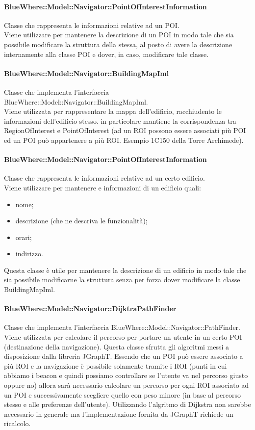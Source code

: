 \documentclass[../SpecificaTecnica.tex]{subfiles}
\begin{document}
				\paragraph{BlueWhere::Model::Navigator::PointOfInterestInformation}
					Classe che rappresenta le informazioni relative ad un POI. \\
					Viene utilizzare per mantenere la descrizione di un POI in modo tale che sia possibile modificare la struttura della stessa, al posto di avere la descrizione internamente alla classe POI e dover, in caso, modificare tale classe.
				\paragraph{BlueWhere::Model::Navigator::BuildingMapIml}
					Classe che implementa l'interfaccia BlueWhere::Model::Navigator::BuildingMapIml. \\
					Viene utilizzata per rappresentare la mappa dell'edificio, racchiudento le informazioni dell'edificio stesso. in particolare mantiene la corrispondenza tra RegionOfInterest e PointOfInterest (ad un ROI possono essere associati più POI ed un POI può appartenere a più ROI. Esempio 1C150 della Torre Archimede).
				\paragraph{BlueWhere::Model::Navigator::PointOfInterestInformation}
					Classe che rappresenta le informazioni relative ad un certo edificio. \\
					Viene utilizzare per mantenere e informazioni di un edificio quali:
					\begin{itemize}
						\item nome;
						\item descrizione (che ne descriva le funzionalità);
						\item orari;
						\item indirizzo.
					\end{itemize}
					Questa classe è utile per mantenere la descrizione di un edificio in modo tale che sia possibile modificarne la struttura senza per forza dover modificare la classe BuildingMapIml. 
				\paragraph{BlueWhere::Model::Navigator::DijktraPathFinder}
					Classe che implementa l'interfaccia BlueWhere::Model::Navigator::PathFinder. \\
					Viene utilizzata per calcolare il percorso per portare un utente in un certo POI (destinazione della navigazione). Questa classe sfrutta gli algoritmi messi a disposizione dalla libreria JGraphT. Essendo che un POI può essere associato a più ROI e la navigazione è possibile solamente tramite i ROI (punti in cui abbiamo i beacon e quindi possiamo controllare se l'utente va nel percorso giusto oppure no) allora sarà necessario calcolare un percorso per ogni ROI associato ad un POI e successivamente scegliere quello con peso minore (in base al percorso stesso e alle preferenze dell'utente). Utilizzando l'algritmo di Dijkstra non sarebbe necessario in generale ma l'implementazione fornita da JGraphT richiede un ricalcolo.
\end{document}
